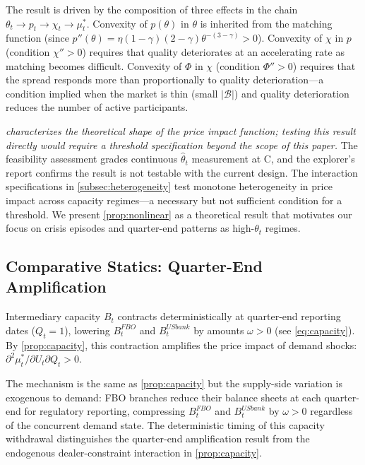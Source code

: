 The result is driven by the composition of three effects in the chain
$\theta_t \to p_t \to \chi_t \to \mu_t^*$. Convexity of $p(\theta)$ in
$\theta$ is inherited from the matching function (since
$p''(\theta) = \eta(1-\gamma)(2-\gamma)\theta^{-(3-\gamma)} > 0$). Convexity
of $\chi$ in $p$ (condition $\chi'' > 0$) requires that quality deteriorates
at an accelerating rate as matching becomes difficult. Convexity of $\Phi$ in
$\chi$ (condition $\Phi'' > 0$) requires that the spread responds more than
proportionally to quality deterioration---a condition implied when the market is
thin (small $|\mathcal{B}|$) and quality deterioration reduces the number of
active participants.

\emph{ characterizes the theoretical shape of the price impact
function; testing this result directly would require a threshold specification
beyond the scope of this paper.} The feasibility assessment grades continuous
$\hat{\theta}_t$ measurement at C, and the explorer's report confirms the result
is not testable with the current design. The interaction specifications in
\cref{subsec:heterogeneity} test monotone heterogeneity in price impact across
capacity regimes---a necessary but not sufficient condition for a threshold. We
present \cref{prop:nonlinear} as a theoretical result that motivates our focus on
crisis episodes and quarter-end patterns as high-$\theta_t$ regimes.


\subsection{Comparative Statics: Quarter-End Amplification}
\label{subsec:comparative-statics-qe}

\begin{proposition}\label{prop:qe}
  Intermediary capacity $B_t$ contracts deterministically at quarter-end
  reporting dates ($Q_t = 1$), lowering $B_t^{FBO}$ and $B_t^{USbank}$ by
  amounts $\omega > 0$ (see \cref{eq:capacity}). By \cref{prop:capacity}, this contraction amplifies
  the price impact of demand shocks:
  $\partial^2 \mu_t^* / \partial U_t \partial Q_t > 0$.
\end{proposition}

The mechanism is the same as \cref{prop:capacity} but the supply-side variation is
exogenous to demand: FBO branches reduce their balance sheets at each quarter-end
for regulatory reporting, compressing $B_t^{FBO}$ and $B_t^{USbank}$ by
$\omega > 0$ regardless of the concurrent demand state. The deterministic timing
of this capacity withdrawal distinguishes the quarter-end amplification result
from the endogenous dealer-constraint interaction in \cref{prop:capacity}.

